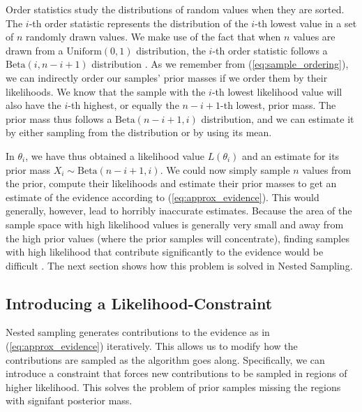 \documentclass[12pt, a4paper]{report}
\begin{document}
Order statistics study the distributions of random values when they are sorted.
The $i$-th order statistic represents the distribution of the $i$-th lowest value in a set of $n$ randomly drawn values.
We make use of the fact that when $n$ values are drawn from a $\textrm{Uniform}(0,1)$ distribution, the $i$-th order statistic follows a $\textrm{Beta}(i, n-i+1)$ distribution \cite[63]{computational_stats}.
As we remember from (\ref{eq:sample_ordering}), we can indirectly order our samples' prior masses if we order them by their likelihoods.
We know that the sample with the $i$-th lowest likelihood value will also have the $i$-th highest, or equally the $n-i+1$-th lowest, prior mass.
The prior mass thus follows a $\textrm{Beta}(n-i+1, i)$ distribution, and we can estimate it by either sampling from the distribution or by using its mean.

In $\theta_{i}$, we have thus obtained a likelihood value $L(\theta_{i})$ and an estimate for its prior mass $X_{i} \sim  \textrm{Beta}(n-i+1, i)$.
We could now simply sample $n$ values from the prior, compute their likelihoods and estimate their prior masses to get an estimate of the evidence according to (\ref{eq:approx_evidence}).
This would generally, however, lead to horribly inaccurate estimates.
Because the area of the sample space with high likelihood values is generally very small and away from the high prior values (where the prior samples will concentrate), finding samples with high likelihood that contribute significantly to the evidence would be difficult \cite[7]{skilling}.
The next section shows how this problem is solved in Nested Sampling.

\subsection{Introducing a Likelihood-Constraint} 
Nested sampling generates contributions to the evidence as in (\ref{eq:approx_evidence}) iteratively.
This allows us to modify how the contributions are sampled as the algorithm goes along.
Specifically, we can introduce a constraint that forces new contributions to be sampled in regions of higher likelihood.
This solves the problem of prior samples missing the regions with signifant posterior mass.
\end{document}
